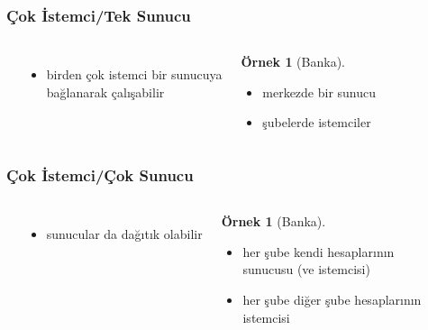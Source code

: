 \documentclass[dvipsnames]{beamer}
\theoremstyle{definition}
\theoremstyle{example}
\newtheorem{ornek}[theorem]{Örnek}
\theoremstyle{plain}
\begin{document}
\begin{frame}
  \frametitle{Çok İstemci/Tek Sunucu}

  \begin{columns}
    \begin{center}
    \end{center}

    \begin{itemize}
      \item birden çok istemci bir sunucuya\\
	bağlanarak çalışabilir
    \end{itemize}

    \pause
    \bigskip
    \begin{ornek}[Banka]
      \begin{itemize}
        \item merkezde bir sunucu
        \item şubelerde istemciler
      \end{itemize}
    \end{ornek}
  \end{columns}
\end{frame}

\begin{frame}
  \frametitle{Çok İstemci/Çok Sunucu}

  \begin{columns}
    \begin{center}
    \end{center}

    \begin{itemize}
      \item sunucular da dağıtık olabilir
    \end{itemize}

    \pause
    \bigskip
    \begin{ornek}[Banka]
      \begin{itemize}
        \item her şube kendi hesaplarının\\
	  sunucusu (ve istemcisi)
        \item her şube diğer şube hesaplarının\\
	  istemcisi
      \end{itemize}
    \end{ornek}
  \end{columns}
\end{frame}
\end{document}
